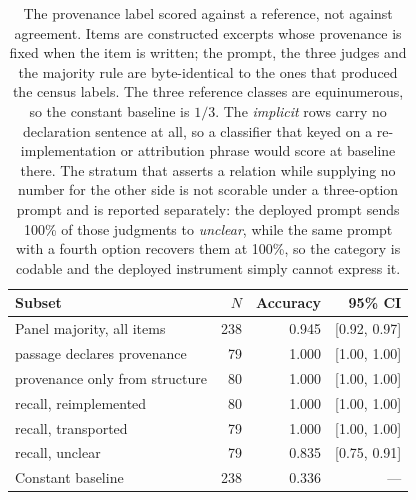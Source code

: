 \begin{table}[t]
\centering\scriptsize
\setlength{\tabcolsep}{3pt}
\begin{tabular}{@{}lrrr@{}}
\toprule
Subset & $N$ & Accuracy & 95\% CI \\
\midrule
Panel majority, all items & 238 & 0.945 & [0.92, 0.97] \\
\quad passage declares provenance & 79 & 1.000 & [1.00, 1.00] \\
\quad provenance only from structure & 80 & 1.000 & [1.00, 1.00] \\
\midrule
\quad recall, reimplemented & 80 & 1.000 & [1.00, 1.00] \\
\quad recall, transported & 79 & 1.000 & [1.00, 1.00] \\
\quad recall, unclear & 79 & 0.835 & [0.75, 0.91] \\
\midrule
Constant baseline & 238 & 0.336 & --- \\
\bottomrule
\end{tabular}
\caption{The provenance label scored against a reference, not against agreement. Items are constructed excerpts whose provenance is fixed when the item is written; the prompt, the three judges and the majority rule are byte-identical to the ones that produced the census labels. The three reference classes are equinumerous, so the constant baseline is $1/3$. The \emph{implicit} rows carry no declaration sentence at all, so a classifier that keyed on a re-implementation or attribution phrase would score at baseline there. The stratum that asserts a relation while supplying no number for the other side is not scorable under a three-option prompt and is reported separately: the deployed prompt sends 100\% of those judgments to \emph{unclear}, while the same prompt with a fourth option recovers them at 100\%, so the category is codable and the deployed instrument simply cannot express it.}
\label{tab:provenance-validation}
\end{table}
